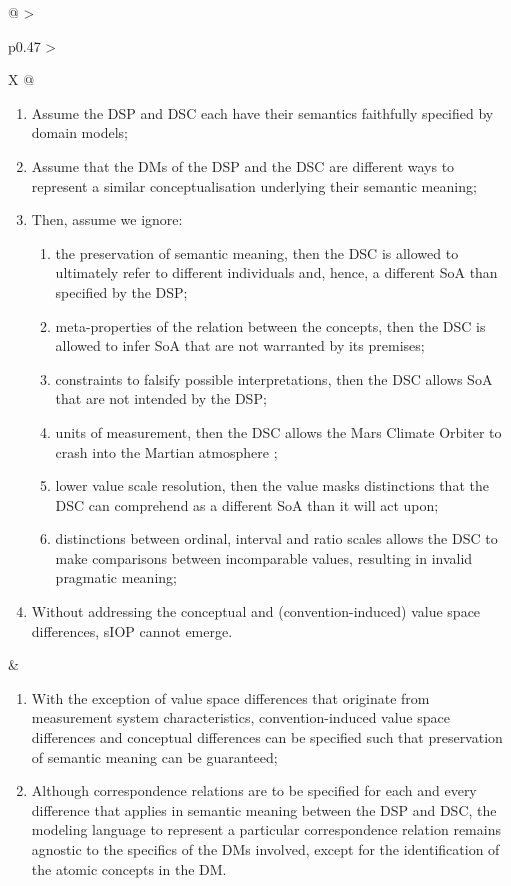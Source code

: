 \begin{xltabular}[l]{\linewidth}{@{} >{\small\raggedright\arraybackslash}p{0.47\linewidth} >{\small\raggedright\arraybackslash}X @{}}
\begin{enumerate}[left=6pt, nosep]
  \item Assume the DSP and DSC each have their semantics faithfully specified by domain models;
  \item Assume that the DMs of the DSP and the DSC are different ways to represent a similar conceptualisation underlying their semantic meaning;
  \item Then, assume we ignore:
  \begin{enumerate}
    \item the preservation of semantic meaning, then the DSC is allowed to ultimately refer to different individuals and, hence, a different SoA than specified by the DSP; 
    \item meta-properties of the relation between the concepts, then the DSC is allowed to infer SoA that are not warranted by its premises;
    \item constraints to falsify possible interpretations, then the DSC allows SoA that are not intended by the DSP; 
    \item units of measurement, then the DSC allows the Mars Climate Orbiter to crash into the Martian atmosphere \cite{Leveson2004};
    \item lower value scale resolution, then the value masks distinctions that the DSC can comprehend as a different SoA than it will act upon;
    \item distinctions between ordinal, interval and ratio scales allows the DSC to make comparisons between incomparable values, resulting in invalid pragmatic meaning;
  \end{enumerate}
  \item Without addressing the conceptual and (convention-induced) value space differences, sIOP cannot emerge.
\end{enumerate}
&
\begin{enumerate}[left=10pt, nosep]
  \item With the exception of value space differences that originate from measurement system characteristics, convention-induced value space differences and conceptual differences can be specified such that preservation of semantic meaning can be guaranteed;
  \item Although correspondence relations are to be specified for each and every difference that applies in semantic meaning between the DSP and DSC, the modeling language to represent a particular correspondence relation remains agnostic to the specifics of the DMs involved, except for the identification of the atomic concepts in the DM.

\end{enumerate}
\end{xltabular}
